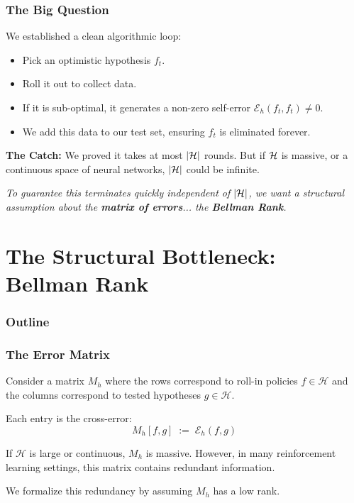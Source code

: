 \documentclass[aspectratio=169]{beamer}
\begin{document}
\begin{frame}\frametitle{The Big Question}

We established a clean algorithmic loop:
\begin{itemize}
    \item Pick an optimistic hypothesis $f_t$.
    \item Roll it out to collect data.
    \item If it is sub-optimal, it generates a non-zero self-error $\mathcal{E}_h(f_t, f_t) \neq 0$.
    \item We add this data to our test set, ensuring $f_t$ is eliminated forever.
\end{itemize}

\vspace{0.4cm}
\pause
\textbf{The Catch:}
We proved it takes at most $|\mathcal{H}|$ rounds. But if $\mathcal{H}$ is massive, or a continuous space of neural networks, $|\mathcal{H}|$ could be infinite. 

\vspace{0.4cm}
\pause
\textit{To guarantee this terminates quickly independent of $|\mathcal{H}|$,
  we want a structural assumption about the \textbf{matrix of
    errors}... the \textbf{Bellman Rank}.}

\end{frame}


\section{The Structural Bottleneck: Bellman Rank}

\begin{frame}[noframenumbering]
  \frametitle{Outline}
  \tableofcontents[currentsection]
\end{frame}


\begin{frame}\frametitle{The Error Matrix}

Consider a matrix $M_h$ where the rows correspond to roll-in policies $f \in \mathcal{H}$ and the columns correspond to tested hypotheses $g \in \mathcal{H}$. 

\vspace{0.2cm}
Each entry is the cross-error:
\[
M_h[f,g] \;:=\; \mathcal{E}_h(f,g)
\]

\pause
\vspace{0.2cm}
If $\mathcal{H}$ is large or continuous, $M_h$ is massive. However, in many reinforcement learning settings, this matrix contains redundant information. 

\vspace{0.2cm}
We formalize this redundancy by assuming $M_h$ has a low rank.
\end{frame}
\end{document}
